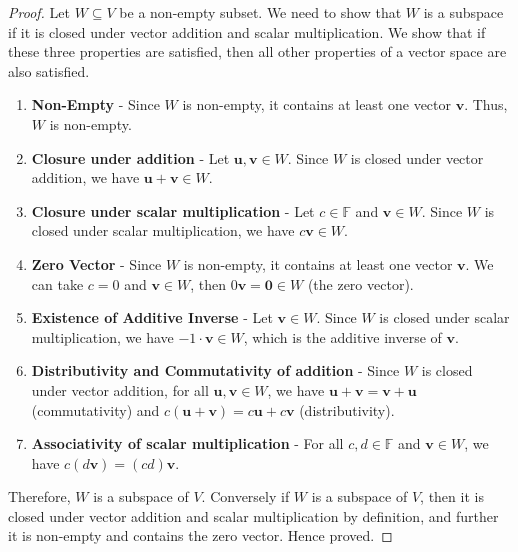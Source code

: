 \documentclass[openany]{book}
\begin{document}
\begin{proof}
    Let $W \subseteq V$ be a non-empty subset. We need to show that $W$ is a subspace if it is closed under vector addition and scalar multiplication. We show that if these three properties are satisfied, then all other properties of a vector space are also satisfied.
    \begin{enumerate}
        \item \textbf{Non-Empty} - Since $W$ is non-empty, it contains at least one vector $\mathbf{v}$. Thus, $W$ is non-empty.
        \item \textbf{Closure under addition} - Let $\mathbf{u}, \mathbf{v} \in W$. Since $W$ is closed under vector addition, we have $\mathbf{u} + \mathbf{v} \in W$.
        \item \textbf{Closure under scalar multiplication} - Let $c \in \mathbb{F}$ and $\mathbf{v} \in W$. Since $W$ is closed under scalar multiplication, we have $c\mathbf{v} \in W$.
        \item \textbf{Zero Vector} - Since $W$ is non-empty, it contains at least one vector $\mathbf{v}$. We can take $c = 0$ and $\mathbf{v} \in W$, then $0\mathbf{v} = \mathbf{0} \in W$ (the zero vector).
        \item \textbf{Existence of Additive Inverse} - Let $\mathbf{v} \in W$. Since $W$ is closed under scalar multiplication, we have $-1 \cdot \mathbf{v} \in W$, which is the additive inverse of $\mathbf{v}$.
        \item \textbf{Distributivity and Commutativity of addition} - Since $W$ is closed under vector addition, for all $\mathbf{u}, \mathbf{v} \in W$, we have $\mathbf{u} + \mathbf{v} = \mathbf{v} + \mathbf{u}$ (commutativity) and $c(\mathbf{u} + \mathbf{v}) = c\mathbf{u} + c\mathbf{v}$ (distributivity).
        \item \textbf{Associativity of scalar multiplication} - For all $c, d \in \mathbb{F}$ and $\mathbf{v} \in W$, we have $c(d\mathbf{v}) = (cd)\mathbf{v}$.
    \end{enumerate}
    Therefore, $W$ is a subspace of $V$.
    Conversely if $W$ is a subspace of $V$, then it is closed under vector addition and scalar multiplication by definition, and further it is non-empty and contains the zero vector. Hence proved. 
\end{proof}
\end{document}
